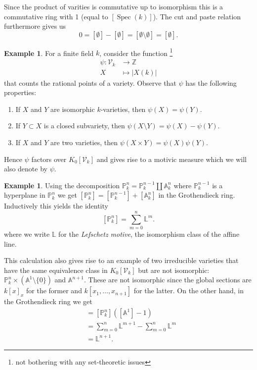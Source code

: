 \documentclass[11pt, a4paper, german, twoside]{article}
\theoremstyle{plain}
\theoremstyle{definition}
\newtheorem{example}[theorem]{Example}
\newcommand{\gring}[1][k]{K_0[\mathcal{V}_#1]}
\DeclareMathOperator{\Spec}{Spec}
\begin{document}
Since the product of varities is commutative up to isomorphism this is a commutative ring with 1 (equal to $[\Spec(k)]$). 
The cut and paste relation furthermore gives us
\[
    0 = [\emptyset] - [\emptyset] = [\emptyset \setminus \emptyset] = [\emptyset].
\]

\begin{example}
    \label{countMeasure}
    For a finite field $k$, consider the function \footnote{not bothering with any set-theoretic issues} 
    \begin{align*}
        \psi \colon \mathcal{V}_k & \to   \mathbb{Z}\\
        X & \mapsto |X(k)|
    \end{align*}
    that counts the rational points of a variety.
    Observe that $\psi$ has the following properties:
    \begin{enumerate}
        \item If $X$ and $Y$ are isomorphic $k$-varieties, then $\psi(X) = \psi(Y)$.
        \item If $Y \subset X$ is a closed subvariety, then $\psi(X \setminus Y) = \psi(X) - \psi(Y)$.
        \item If $X$ and $Y$ are two varieties, then $\psi(X \times Y) = \psi(X)\psi(Y)$.
    \end{enumerate}
    Hence $\psi$ factors over $\gring[k]$ and gives rise to a motivic measure which we will also denote by $\psi$.
\end{example}

\begin{example}
    \label{projSum}
    Using the decomposition $\mathbb{P}_k^n = \mathbb{P}_k^{n-1} \coprod \mathbb{A}_k^n$ where $\mathbb{P}_k^{n-1}$ is a hyperplane
    in $\mathbb{P}_k^n$  we get $[\mathbb{P}_k^n] = [\mathbb{P}_k^{n-1}] + [\mathbb{A}_k^n]$ in the Grothendieck ring.
    Inductively this yields the identity 
    \[
        [\mathbb{P}_k^n] = \sum_{m=0}^n \mathbb{L}^m.
    \]
    where we write $\mathbb{L}$ for the \emph{Lefschetz motive}, the isomorphism class of the affine line.
\end{example}

This calculation also gives rise to an example of two irreducible varieties that have the same equivalence class in $\gring[k]$ but are not
isomorphic: $\mathbb{P}_k^n \times (\mathbb{A}^1\setminus \{0\})$ and $\mathbb{A}^{n+1}$. These are not isomorphic since the global sections 
are $k[x]_{x}$ for the former and $k[x_1,\dots,x_{n+1}]$ for the latter. On the other hand, in the Grothendieck ring we get
\begin{align*}
    [\mathbb{P}_k^n \times \left (\mathbb{A}^1 \setminus \{0\}\right )] &= [\mathbb{P}_k^n]\left ([\mathbb{A}^1] - 1\right ) \\
                                                                      &= \sum_{m=0}^n \mathbb{L}^{m+1} - \sum_{m=0}^n \mathbb{L}^m \\
                                                                      &= \mathbb{L}^{n+1}.
\end{align*}
\end{document}
